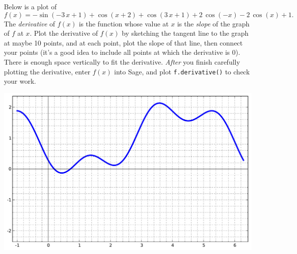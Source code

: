 Below is a plot of $$f(x)=-\sin\left(-3 \, x + 1\right) + \cos\left(x + 2\right) + \cos\left(3 \, x + 1\right) + 2 \, \cos\left(-x\right) - 2 \, \cos\left(x\right) + 1.$$  The {\em \color{red}derivative} of $f(x)$ is the function whose value at $x$ is the {\em slope} of the graph of $f$ at $x$.  Plot the derivative of $f(x)$ by sketching the tangent line to the graph at maybe 10 points, and at each point, plot the slope of that line, then connect your points (it's a good idea to include all points at which the derivative is 0).  There is enough space vertically to fit the derivative.  {\em After} you finish carefully plotting the derivative, enter $f(x)$ into Sage, and plot {\color{blue}\verb|f.derivative()|} to check your work.
\begin{center}\includegraphics{functions/62.pdf}\end{center}\newpage

